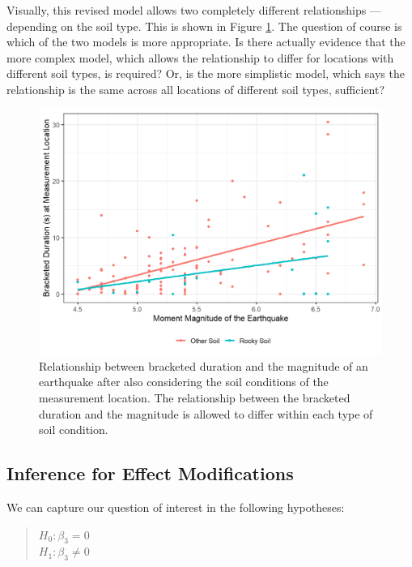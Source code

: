\documentclass[
]{book}
\theoremstyle{plain}
\theoremstyle{mydefn}
\theoremstyle{myexmpl}
\theoremstyle{remark}
\begin{document}
Visually, this revised model allows two completely different relationships --- depending on the soil type. This is shown in Figure \ref{fig:regextensions-int-plot}. The question of course is which of the two models is more appropriate. Is there actually evidence that the more complex model, which allows the relationship to differ for locations with different soil types, is required? Or, is the more simplistic model, which says the relationship is the same across all locations of different soil types, sufficient?

\begin{figure}

{\centering \includegraphics[width=0.8\linewidth]{./Images/regextensions-int-plot-1} 

}

\caption{Relationship between bracketed duration and the magnitude of an earthquake after also considering the soil conditions of the measurement location.  The relationship between the bracketed duration and the magnitude is allowed to differ within each type of soil condition.}\label{fig:regextensions-int-plot}
\end{figure}

\hypertarget{inference-for-effect-modifications}{%
\subsection{Inference for Effect Modifications}\label{inference-for-effect-modifications}}

We can capture our question of interest in the following hypotheses:

\begin{quote}
\(H_0: \beta_3 = 0\)\\
\(H_1: \beta_3 \neq 0\)
\end{quote}
\end{document}
